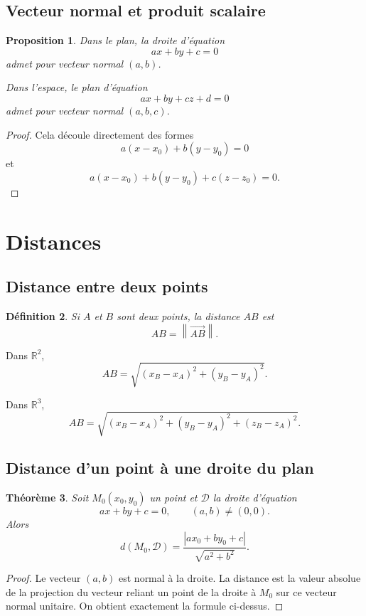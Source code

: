 \documentclass[11pt,a4paper]{article}
\newtheorem{definition}{Définition}[section]
\newtheorem{theoreme}[definition]{Théorème}
\newtheorem{proposition}[definition]{Proposition}
\theoremstyle{remark}
\newcommand{\R}{\mathbb{R}}
\newcommand{\Norm}[1]{\left\|#1\right\|}
\newcommand{\abs}[1]{\left|#1\right|}
\begin{document}
\subsection{Vecteur normal et produit scalaire}

\begin{proposition}
Dans le plan, la droite d’équation
\[
ax+by+c=0
\]
admet pour vecteur normal \((a,b)\).

Dans l’espace, le plan d’équation
\[
ax+by+cz+d=0
\]
admet pour vecteur normal \((a,b,c)\).
\end{proposition}

\begin{proof}
Cela découle directement des formes
\[
a(x-x_0)+b(y-y_0)=0
\]
et
\[
a(x-x_0)+b(y-y_0)+c(z-z_0)=0.
\]
\end{proof}

\section{Distances}

\subsection{Distance entre deux points}

\begin{definition}
Si \(A\) et \(B\) sont deux points, la distance \(AB\) est
\[
AB=\Norm{\overrightarrow{AB}}.
\]
\end{definition}

Dans \(\R^2\),
\[
AB=\sqrt{(x_B-x_A)^2+(y_B-y_A)^2}.
\]

Dans \(\R^3\),
\[
AB=\sqrt{(x_B-x_A)^2+(y_B-y_A)^2+(z_B-z_A)^2}.
\]

\subsection{Distance d’un point à une droite du plan}

\begin{theoreme}
Soit \(M_0(x_0,y_0)\) un point et \(\mathcal D\) la droite d’équation
\[
ax+by+c=0,
\qquad (a,b)\neq (0,0).
\]
Alors
\[
d(M_0,\mathcal D)=\frac{\abs{ax_0+by_0+c}}{\sqrt{a^2+b^2}}.
\]
\end{theoreme}

\begin{proof}
Le vecteur \((a,b)\) est normal à la droite. La distance est la valeur absolue de la projection du vecteur reliant un point de la droite à \(M_0\) sur ce vecteur normal unitaire. On obtient exactement la formule ci-dessus.
\end{proof}
\end{document}
